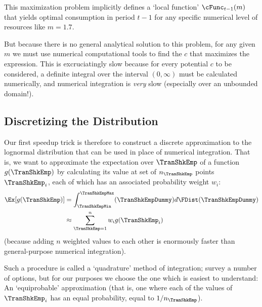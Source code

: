 \lstset{basicstyle=\ttfamily\footnotesize,breaklines=true,language=Python,frame=single}


This maximization problem implicitly defines a `local function' $\cFunc_{t-1}(m)$ that yields optimal consumption in period $t-1$ for any specific numerical level of resources like $m=1.7$.%

But because there is no general analytical solution to this problem, for any given $m$ we must use numerical computational tools to find the $c$ that maximizes the expression.  This is excruciatingly slow because for every potential $c$ to be considered, a definite integral over the interval $(0,\infty)$ must be calculated numerically, and numerical integration is \textit{very} slow (especially over an unbounded domain!).

\hypertarget{discretizing-the-distribution}{}
\subsection{Discretizing the Distribution}
Our first speedup trick is therefore to construct a discrete approximation to the lognormal distribution that can be used in place of numerical integration.  That is, we want to approximate the expectation over $\TranShkEmp$ of a function $g(\TranShkEmp)$ by calculating its value at set of $n_{\TranShkEmp}$ points $\TranShkEmp_{i}$, each of which has an associated probability weight $w_{i}$:
\begin{equation*}\begin{gathered}\begin{aligned}
      \Ex[g(\TranShkEmp)] & = \int_{\TranShkEmpMin}^{\TranShkEmpMax}(\TranShkEmpDummy)d\FDist(\TranShkEmpDummy) \\
      & \approx \sum_{\TranShkEmp = 1}^{n}w_{i}g(\TranShkEmp_{i})
    \end{aligned}\end{gathered}\end{equation*}
(because adding $n$ weighted values to each other is enormously faster than general-purpose numerical integration).

Such a procedure is called a `quadrature' method of integration; \cite{Tanaka2013-bc} survey a number of options, but for our purposes we choose the one which is easiest to understand: An `equiprobable' approximation (that is, one where each of the values of $\TranShkEmp_{i}$ has an equal probability, equal to $1/n_{\TranShkEmp}$).

